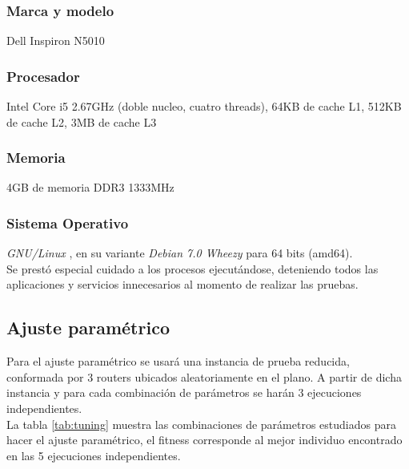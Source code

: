 \documentclass[journal]{IEEEtran}
\begin{document}
\subsubsection{Marca y modelo}

Dell Inspiron N5010\\

\subsubsection{Procesador}

Intel Core i5 2.67GHz (doble nucleo, cuatro threads), 64KB de cache L1, 512KB de cache L2, 3MB de cache L3\\

\subsubsection{Memoria}

4GB de memoria DDR3 1333MHz\\

\subsubsection{Sistema Operativo}

\emph{GNU/Linux} \cite{gnu} \cite{linux}, en su variante \emph{Debian 7.0 Wheezy} \cite{debian:stable} para 64 bits (amd64).\\

Se prestó especial cuidado a los procesos ejecutándose, deteniendo todos las aplicaciones y servicios innecesarios al momento de realizar las pruebas.

\subsection{Ajuste paramétrico}

Para el ajuste paramétrico se usará una instancia de prueba reducida, conformada por 3 routers ubicados aleatoriamente en el plano. A partir de dicha instancia y para cada combinación de parámetros se harán 3 ejecuciones independientes.\\

La tabla \ref{tab:tuning} muestra las combinaciones de parámetros estudiados para hacer el ajuste paramétrico, el fitness corresponde al mejor individuo encontrado en las 5 ejecuciones independientes.
\end{document}
